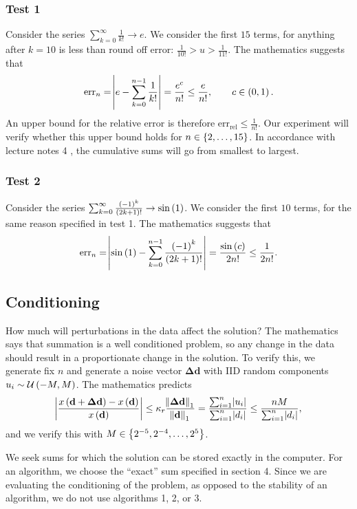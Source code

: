 \documentclass[12pt]{article}
\theoremstyle{definition}
\begin{document}
\subsubsection{Test 1}
Consider the series $\sum_{k=0}^\infty \frac{1}{k!} \to e$. We consider the first $15$ terms, for anything after $k = 10$ is less than round off error: $\frac{1}{10!} > u > \frac{1}{11!}$. The mathematics suggests that
$$
\mathrm{err}_n = \abs{e - \sum_{k=0}^{n-1} \frac{1}{k!}} = \frac{e^c}{n!} \leq \frac{e}{n!}, \qquad c \in \del{0,1}.
$$
An upper bound for the relative error is therefore $\mathrm{err}_{\text{rel}} \leq \frac{1}{n!}$. Our experiment will verify whether this upper bound holds for $n \in \cbr{2,\dots,15}$. In accordance with lecture notes 4 \cite{lec4}, the cumulative sums will go from smallest to largest.

\subsubsection{Test 2}
Consider the series $\sum_{k=0}^\infty\frac{\del{-1}^k}{\del{2k+1}!} \to \sin\del{1}$. We consider the first $10$ terms, for the same reason specified in test 1. The mathematics suggests that
$$
\mathrm{err}_n = \abs{\sin\del{1}-\sum_{k=0}^{n-1}\frac{\del{-1}^k}{\del{2k+1}!}} = \frac{\sin\del{c}}{2n!} \leq \frac{1}{2n!}.
$$

\subsection{Conditioning}
How much will perturbations in the data affect the solution? The mathematics says that summation is a well conditioned problem, so any change in the data should result in a proportionate change in the solution. To verify this, we generate fix $n$ and generate a noise vector $\mathbf{\Delta d}$ with IID random components $u_i \sim \mathcal{U}\del{-M,M}$. The mathematics predicts
$$
\abs{\frac{x\del{\mathbf{d+\Delta d}}-x\del{\mathbf{d}}}{x\del{\mathbf{d}}}} \leq \kappa_r\frac{\norm{\mathbf{\Delta d}}_1}{\norm{\mathbf{d}}_1} = \frac{\sum_{i=1}^n \abs{u_i}}{\sum_{i=1}^n\abs{d_i}} \leq \frac{nM}{\sum_{i=1}^n\abs{d_i}},
$$
and we verify this with $M \in \cbr{2^{-5},2^{-4},\dots,2^5}$.

We seek sums for which the solution can be stored exactly in the computer. For an algorithm, we choose the ``exact'' sum specified in section 4. Since we are evaluating the conditioning of the problem, as opposed to the stability of an algorithm, we do not use algorithms 1, 2, or 3.
\end{document}
